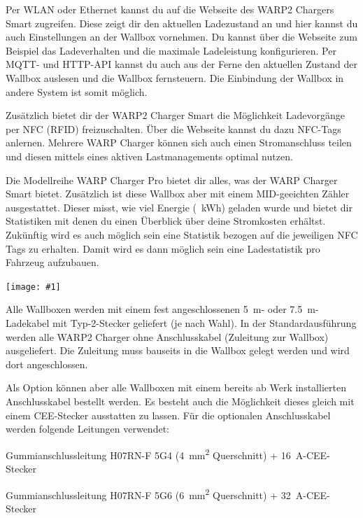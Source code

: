 \documentclass[a4paper,10pt]{article}
\newcommand{\gfx}[1]{\texttt{[image: \#1]}}
\begin{document}
\begin{multicols*}{2}
	Per WLAN oder Ethernet kannst du auf die Webseite des WARP2 Chargers Smart
	zugreifen. Diese zeigt dir den aktuellen Ladezustand an und hier kannst du
	auch Einstellungen an der Wallbox vornehmen. Du kannst über die Webseite 
	zum Beispiel das Ladeverhalten und die maximale Ladeleistung konfigurieren.
	Per MQTT- und HTTP-API kannst du auch aus der Ferne den aktuellen Zustand 
	der Wallbox auslesen und die Wallbox fernsteuern. 
	Die Einbindung der Wallbox in andere System ist somit möglich.

	Zusätzlich bietet dir der WARP2 Charger Smart die Möglichkeit Ladevorgänge
	per NFC (RFID) freizuschalten. Über die Webseite kannst du dazu NFC-Tags
	anlernen. Mehrere WARP Charger können sich auch einen Stromanschluss teilen
	und diesen mittels eines aktiven Lastmanagements optimal nutzen.

	Die Modellreihe WARP Charger Pro bietet dir alles, was der WARP Charger Smart
	bietet. Zusätzlich ist diese Wallbox aber mit einem MID-geeichten Zähler
	ausgestattet. Dieser misst, wie viel Energie (\SI{}{\kWh}) geladen
	wurde und bietet dir Statistiken mit denen du einen Überblick über deine
	Stromkosten erhältst. Zukünftig wird es auch möglich sein eine Statistik
	bezogen auf die jeweiligen NFC Tags zu erhalten. Damit wird es dann möglich
	sein eine Ladestatistik pro Fahrzeug aufzubauen.

	\gfx{./img_warp2/resized/type_2_connector_ready}

	Alle Wallboxen werden mit einem fest angeschlossenen
	\SI{5}{\meter}- oder \SI{7,5}{\meter}-Ladekabel mit Typ-2-Stecker geliefert
	(je nach Wahl).
	In der Standardausführung werden alle WARP2 Charger ohne Anschlusskabel
	(Zuleitung zur Wallbox) ausgeliefert. Die Zuleitung muss bauseits in die
	Wallbox gelegt werden und wird dort angeschlossen.

	Als Option können aber alle Wallboxen mit einem bereits ab Werk
	installierten Anschlusskabel bestellt werden. Es besteht auch die
	Möglichkeit dieses gleich mit einem CEE-Stecker ausstatten zu lassen.
	Für die optionalen Anschlusskabel werden folgende Leitungen verwendet:

	\begin{description}[leftmargin=!,labelwidth=\widthof{\textbf{\SI{22}{\kilo\watt}}}]
		\item[\SI{11}{\kilo\watt}]Gummianschlussleitung H07RN-F 5G4
		      (\SI{4}{\square\milli\meter}
		      Querschnitt) + \SI{16}{\ampere}-CEE-Stecker
		\item[\SI{22}{\kilo\watt}]Gummianschlussleitung H07RN-F 5G6
		      (\SI{6}{\square\milli\meter}
		      Querschnitt) + \SI{32}{\ampere}-CEE-Stecker
	\end{description}


\end{multicols*}
\end{document}
